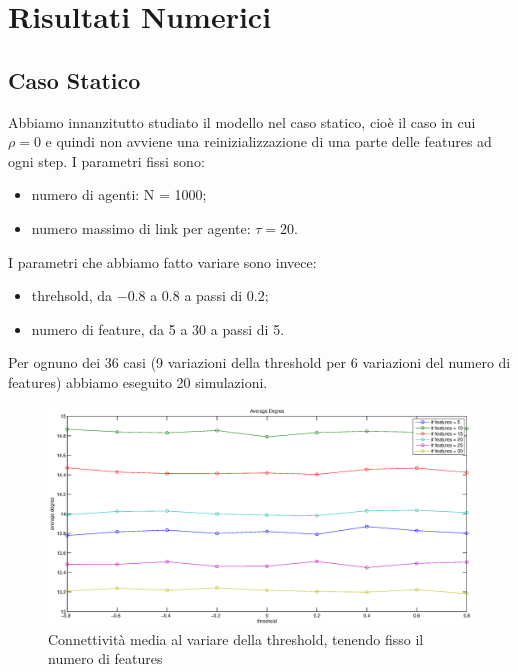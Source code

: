 \documentclass[a4paper,10pt]{article}
\begin{document}
\newpage

\section{Risultati Numerici}
\subsection{Caso Statico}
Abbiamo innanzitutto studiato il modello nel caso statico, cio\`{e} il caso in cui $\rho = 0$ e quindi non avviene una reinizializzazione di una parte delle features ad ogni step.
I parametri fissi sono:
\begin{itemize}
\item numero di agenti: N = 1000;
\item numero massimo di link per agente: $\tau = 20$.
\end{itemize}
I parametri che abbiamo fatto variare sono invece:
\begin{itemize}
\item threhsold, da $-0.8$ a $0.8$ a passi di $0.2$;
\item numero di feature, da 5 a 30 a passi di 5.
\end{itemize}
Per ognuno dei 36 casi (9 variazioni della threshold per 6 variazioni del numero di features) abbiamo eseguito 20 simulazioni.

\begin{figure}[!ht]
\begin{center}
\includegraphics[width=\textwidth]{AverageDegreeThreshold.eps}
\end{center}
\caption{Connettivit\`{a} media al variare della threshold, tenendo fisso il numero di features}
\label{2.1.1}
\end{figure}
\end{document}
